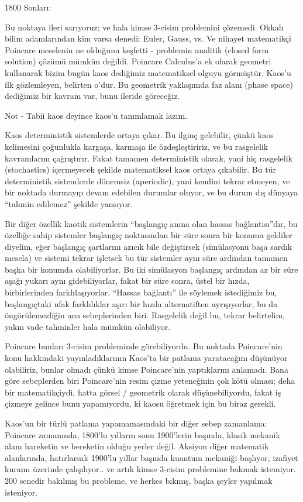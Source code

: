 \documentclass[12pt,fleqn]{article}\usepackage{../../common}
\begin{document}
1800 Sonları:

Bu noktaya ileri sarıyoruz; ve hala kimse 3-cisim problemini
çözemedi. Okkalı bilim adamlarından kim varsa denedi: Euler, Gauss, vs. Ve
nihayet matematikçi Poincare meselenin ne olduğunu keşfetti - problemin
analitik (closed form solution) çözümü mümkün değildi. Poincare Calculus'a
ek olarak geometri kullanarak bizim bugün kaos dediğimiz matematiksel
olguyu görmüştür. Kaos'u ilk gözlemleyen, belirten o'dur.  Bu geometrik
yaklaşımda faz alanı (phase space) dediğimiz bir kavram var, bunu ileride
göreceğiz.

Not - Tabii kaos deyince kaos'u tanımlamak lazım.

Kaos deterministik sistemlerde ortaya çıkar. Bu ilginç gelebilir, çünkü
kaos kelimesini çoğunlukla kargaşa, karmaşa ile özdeşleştiririz, ve bu
rasgelelik kavramlarını çağrıştırır. Fakat tamamen deterministik olarak,
yani hiç rasgelelik (stochastics) içermeyecek şekilde matematiksel kaos
ortaya çıkabilir. Bu tür deterministik sistemlerde dönemsiz (aperiodic),
yani kendini tekrar etmeyen, ve bir noktada durmayıp devam edebilen
durumlar oluyor, ve bu durum dış dünyaya ``tahmin edilemez'' şekilde
yansıyor. 

Bir diğer özellik kaotik sistemlerin ``başlangıç anına olan hassas
bağlantısı''dır, bu özelliğe sahip sistemler başlangıç noktasından bir süre
sonra bir konuma geldiler diyelim, eğer başlangıç şartlarını azıcık bile
değiştirsek (simülasyonu başa sardık mesela) ve sistemi tekrar işletsek bu
tür sistemler aynı süre ardından tamamen başka bir konumda
olabiliyorlar. Bu iki simülasyon başlangıç ardından az bir süre aşağı
yukarı aynı gidebiliyorlar, fakat bir süre sonra, üstel bir hızda,
birbirlerinden farklılaşıyorlar. ``Hassas bağlantı'' ile söylemek
istediğimiz bu, başlangıçtaki ufak farklılıklar aşırı bir hızda
alternatiften ayrışıyorlar, bu da öngörülemezliğin ana sebeplerinden
biri. Rasgelelik değil bu, tekrar belirtelim, yakın vade tahminler hala
mümkün olabiliyor.

Poincare bunları 3-cisim probleminde görebiliyordu. Bu noktada Poincare'nin
konu hakkındaki yayınladıklarının Kaos'ta bir patlama yaratacağını
düşünüyor olabiliriz, bunlar olmadı çünkü kimse Poincare'nin yaptıklarını
anlamadı. Bana göre sebeplerden biri Poincare'nin resim çizme yeteneğinin
çok kötü olması; deha bir matematikçiydi, hatta görsel / geometrik olarak
düşünebiliyordu, fakat iş çizmeye gelince bunu yapamıyordu, ki kaosu
öğretmek için bu biraz gerekli.

Kaos'un bir türlü patlama yapamamasındaki bir diğer sebep zamanlama: Poincare
zamanında, 1800'lu yılların sonu 1900'lerin başında, klasik mekanik alanı
hareketin ve bereketin olduğu yerler değil. Aksiyon diğer matematik alanlarında,
hatırlarsak 1900'lu yıllar başında kuantum mekaniği başlıyor, izafiyet kuramı
üzerinde çalışılıyor.. ve artık kimse 3-cisim problemine bakmak istemiyor. 200
senedir bakılmış bu probleme, ve herkes bıkmış, başka şeyler yapılmak isteniyor.
\end{document}
